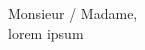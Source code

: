 \documentclass[10pt, a4paper]{extarticle}
\author{Guilherme Nunes Trofino}
\begin{document}
\maketitle

\noindent Monsieur / Madame,\\

\noindent lorem ipsum

\signoff
\end{document}
